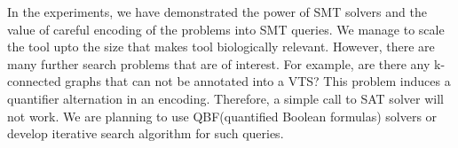 In the experiments, we have demonstrated the power of SMT solvers and the value
of careful encoding of the problems into SMT queries.
%
We manage to scale the tool upto the size that makes tool
biologically relevant.
%
However, there are many further search problems that are of interest.
%
For example, are there any k-connected graphs that can not be
annotated into a VTS?
%
This problem induces a quantifier alternation in an encoding.
%
Therefore, a simple call to SAT solver will not work.
%
We are planning to use QBF(quantified Boolean formulas) solvers or develop
iterative search algorithm for such queries.
%





